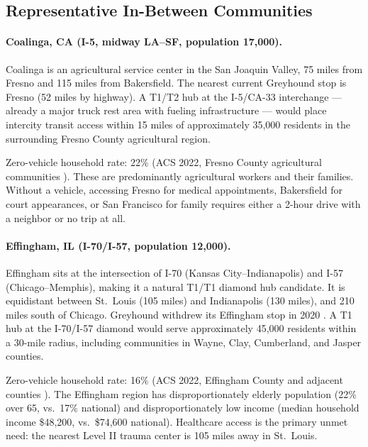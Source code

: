 \subsection{Representative In-Between Communities}

\paragraph{Coalinga, CA (I-5, midway LA--SF, population 17,000).}

Coalinga is an agricultural service center in the San Joaquin Valley, 75 miles from Fresno and 115 miles from Bakersfield. The nearest current Greyhound stop is Fresno (52 miles by highway). A T1/T2 hub at the I-5/CA-33 interchange --- already a major truck rest area with fueling infrastructure --- would place intercity transit access within 15 miles of approximately 35,000 residents in the surrounding Fresno County agricultural region.

Zero-vehicle household rate: 22\% (ACS 2022, Fresno County agricultural communities \citep{ACS_B08201_2022}). These are predominantly agricultural workers and their families. Without a vehicle, accessing Fresno for medical appointments, Bakersfield for court appearances, or San Francisco for family requires either a 2-hour drive with a neighbor or no trip at all.

\paragraph{Effingham, IL (I-70/I-57, population 12,000).}

Effingham sits at the intersection of I-70 (Kansas City--Indianapolis) and I-57 (Chicago--Memphis), making it a natural T1/T1 diamond hub candidate. It is equidistant between St.\ Louis (105 miles) and Indianapolis (130 miles), and 210 miles south of Chicago. Greyhound withdrew its Effingham stop in 2020 \citep{Schwieterman2019}. A T1 hub at the I-70/I-57 diamond would serve approximately 45,000 residents within a 30-mile radius, including communities in Wayne, Clay, Cumberland, and Jasper counties.

Zero-vehicle household rate: 16\% (ACS 2022, Effingham County and adjacent counties \citep{ACS_B08201_2022}). The Effingham region has disproportionately elderly population (22\% over 65, vs.\ 17\% national) and disproportionately low income (median household income \$48,200, vs.\ \$74,600 national). Healthcare access is the primary unmet need: the nearest Level II trauma center is 105 miles away in St.\ Louis.


